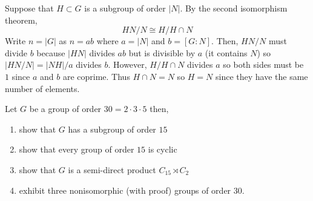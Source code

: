 \documentclass[12pt]{article}
\begin{document}
Suppose that $H \subset G$ is a subgroup of order $|N|$. By the second isomorphism theorem,
\[ HN/N \cong H/H \cap N \]
Write $n = |G|$ as $n = ab$ where $a = |N|$ and $b = [G : N]$. Then, $HN/N$ must divide $b$ because $|HN|$ divides $ab$ but is divisible by $a$ (it contains $N$) so $|HN/N| = |NH|/a$ divides $b$. However, $H / H \cap N$ divides $a$ so both sides must be $1$ since $a$ and $b$ are coprime. Thus $H \cap N = N$ so $H = N$ since they have the same number of elements.

\begin{exercise}
Let $G$ be a group of order $30 = 2 \cdot 3 \cdot 5$ then,
\begin{enumerate}
\item show that $G$ has a subgroup of order $15$
\item show that every group of order $15$ is cyclic
\item show that $G$ is a semi-direct product $C_{15} \rtimes C_2$
\item exhibit three nonisomorphic (with proof) groups of order $30$.
\end{enumerate}
\end{exercise} 
\end{document}
